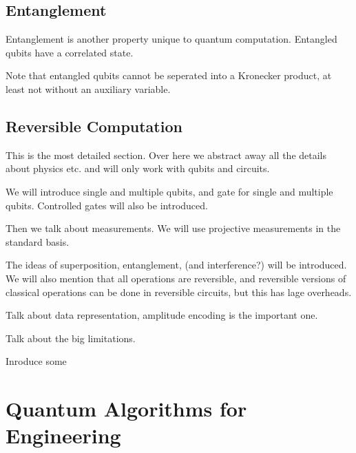 \documentclass{article}
\begin{document}
\subsection{Entanglement}

Entanglement is another property unique to quantum computation. Entangled qubits have a correlated state. 

Note that entangled qubits cannot be seperated into a Kronecker product, at least not without an auxiliary variable.

\subsection{Reversible Computation}



This is the most detailed section. Over here we abstract away all the details about physics etc. and will only work with qubits and circuits.

We will introduce single and multiple qubits, and gate for single and multiple qubits. Controlled gates will also be introduced.

Then we talk about measurements. We will use projective measurements in the standard basis.

The ideas of superposition, entanglement, (and interference?) will be introduced. We will also mention that all operations are reversible, and reversible versions of classical operations can be done in reversible circuits, but this has lage overheads.

Talk about data representation, amplitude encoding is the important one.

Talk about the big limitations.

Inroduce some 

\section{Quantum Algorithms for Engineering}
\end{document}

